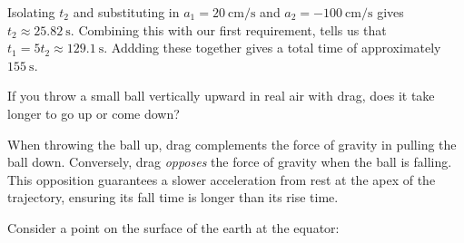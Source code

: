 \documentclass[../feynman-lectures-on-physics.tex]{subfiles}
\begin{document}
\begin{questions}
\begin{solution}
    Isolating $t_2$ and substituting in $a_1 = \SI{20}{\centi\meter\per\second}$ and
    $a_2 = -\SI{100}{\centi\meter\per\second}$ gives $t_2 \approx
    \SI{25.82}{\second}$. Combining this with our first requirement, tells us that
    $t_1 = 5t_2 \approx \SI{129.1}{\second}$. Addding these together gives a total
    time of approximately $\SI{155}{\second}$.
  \end{solution}

	\question If you throw a small ball vertically upward in real air with drag, does it take longer to go up or come down?
    
  \begin{solution}
    When throwing the ball up, drag complements the force of gravity in pulling
    the ball down. Conversely, drag \textit{opposes} the force of gravity when
    the ball is falling. This opposition guarantees a slower acceleration from
    rest at the apex of the trajectory, ensuring its fall time is longer than
    its rise time.
  \end{solution}

	\question Consider a point on the surface of the earth at the equator:
  
  \begin{solution}
\end{solution}
\end{questions}
\end{document}
